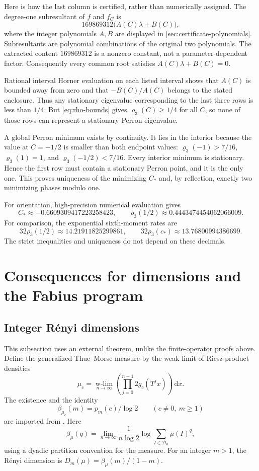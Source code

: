 \documentclass[11pt,a4paper]{article}
\numberwithin{equation}{section}
\theoremstyle{definition}
\theoremstyle{remark}
\newcommand{\dd}{\,\mathrm d}
\begin{document}
Here is how the last column is certified, rather than numerically
assigned. The degree-one subresultant of $f$ and $f_C$ is
\begin{equation}
 169869312\bigl(A(C)\lambda+B(C)\bigr),
 \label{eq:linear-subresultant}
\end{equation}
where the integer polynomials $A,B$ are displayed in
\cref{sec:certificate-polynomials}. Subresultants are polynomial
combinations of the original two polynomials. The extracted content
$169869312$ is a nonzero constant, not a parameter-dependent factor.
Consequently every common root satisfies
$A(C)\lambda+B(C)=0$.

Rational interval Horner evaluation on each listed interval shows that
$A(C)$ is bounded away from zero and that $-B(C)/A(C)$ belongs to the
stated enclosure. Thus any stationary eigenvalue corresponding to the
last three rows is less than $1/4$. But \cref{eq:rho-bounds} gives
$\varrho_3(C)\geq1/4$ for all $C$, so none of those rows can represent a
stationary Perron eigenvalue.

A global Perron minimum exists by continuity. It lies in the interior
because the value at $C=-1/2$ is smaller than both endpoint values:
$\varrho_3(-1)>7/16$, $\varrho_3(1)=1$, and
$\varrho_3(-1/2)<7/16$. Every interior minimum is stationary. Hence the
first row must contain a stationary Perron point, and it is the only
one. This proves uniqueness of the minimizing $C_*$ and, by reflection,
exactly two minimizing phases modulo one.

For orientation, high-precision numerical evaluation gives
\[
 C_*\approx-0.6609309417223258423,\qquad
 \rho_3(1/2)\approx0.4443474454062066009.
\]
For comparison, the exponential sixth-moment rates are
\[
 32\rho_3(1/2)\approx14.21911825299861,\qquad
 32\rho_3(c_*)\approx13.76800994386699.
\]
The strict inequalities and uniqueness do not depend on these decimals.

\section{Consequences for dimensions and the Fabius program}
\label{sec:applications}

\subsection{Integer R\'enyi dimensions}
This subsection uses an external theorem, unlike the finite-operator
proofs above. Define the generalized Thue--Morse measure by the weak
limit of Riesz-product densities
\[
 \mu_c=\operatorname*{w-lim}_{n\to\infty}
 \left(\prod_{j=0}^{n-1}2g_c(T^jx)\right)\dd x.
\]
The existence and the identity
\begin{equation}
 \beta_{\mu_c}(m)=p_m(c)/\log2\qquad(c\neq0,\ m\geq1)
 \label{eq:imported-beta}
\end{equation}
are imported from \cite[Theorem~2.6]{GKS}. Here
\[
 \beta_\mu(q)=\lim_{n\to\infty}
 \frac1{n\log2}\log\sum_{I\in\mathcal D_n}\mu(I)^q,
\]
using a dyadic partition convention for the measure. For an integer
$m>1$, the R\'enyi dimension is
$D_m(\mu)=\beta_\mu(m)/(1-m)$.
\end{document}
